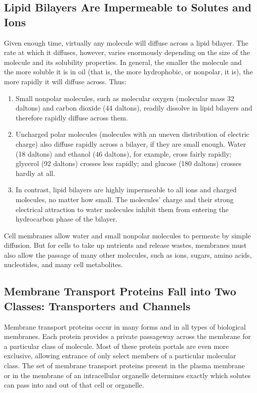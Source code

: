 \subsection{Lipid Bilayers Are Impermeable to Solutes and Ions}


Given enough time, virtually any molecule will diffuse across a lipid bilayer.
The rate at which it diffuses, however, varies
enormously depending on the size of the molecule and its solubility properties.
In general, the smaller the molecule and the more soluble it is in
oil (that is, the more hydrophobic, or nonpolar, it is), the more rapidly it
will diffuse across. Thus:

\begin{enumerate}
\item Small nonpolar molecules, such as molecular oxygen (molecular
mass 32 daltons) and carbon dioxide (44 daltons), readily dissolve
in lipid bilayers and therefore rapidly diffuse across them.
\item Uncharged polar molecules (molecules with an uneven distribution
of electric charge) also diffuse rapidly across a bilayer, if they
are small enough. Water (18 daltons) and ethanol (46 daltons), for
example, cross fairly rapidly; glycerol (92 daltons) crosses less rapidly;
and glucose (180 daltons) crosses hardly at all.
\item In contrast, lipid bilayers are highly impermeable to all ions and
charged molecules, no matter how small. The molecules’ charge
and their strong electrical attraction to water molecules inhibit
them from entering the hydrocarbon phase of the bilayer.
\end{enumerate}

Cell membranes allow water and small nonpolar molecules to permeate
by simple diffusion. But for cells to take up nutrients and release wastes,
membranes must also allow the passage of many other molecules, such
as ions, sugars, amino acids, nucleotides, and many cell metabolites.

\subsection{Membrane Transport Proteins Fall into Two Classes: Transporters and Channels}

Membrane transport proteins occur in many forms and in all types of biological
membranes. Each protein provides a private passageway across
the membrane for a particular class of molecule. Most of these protein portals are even more exclusive,
allowing entrance of only select members of a particular molecular class.
The set of membrane transport proteins present in the plasma
membrane or in the membrane of an intracellular organelle determines
exactly which solutes can pass into and out of that cell or organelle.

